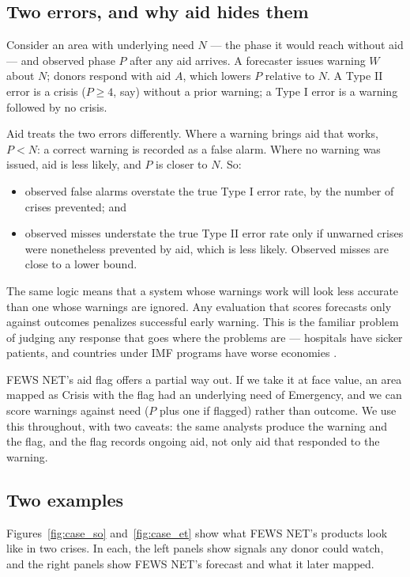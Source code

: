 \documentclass[11pt]{article}
\begin{document}
\subsection{Two errors, and why aid hides them}\label{sec:framework}

Consider an area with underlying need $N$ --- the phase it would reach without aid --- and observed phase $P$ after any aid arrives. A forecaster issues warning $W$ about $N$; donors respond with aid $A$, which lowers $P$ relative to $N$. A Type II error is a crisis ($P \ge 4$, say) without a prior warning; a Type I error is a warning followed by no crisis.

Aid treats the two errors differently. Where a warning brings aid that works, $P < N$: a correct warning is recorded as a false alarm. Where no warning was issued, aid is less likely, and $P$ is closer to $N$. So:
\begin{itemize}
  \item observed false alarms overstate the true Type I error rate, by the number of crises prevented; and
  \item observed misses understate the true Type II error rate only if unwarned crises were nonetheless prevented by aid, which is less likely. Observed misses are close to a lower bound.
\end{itemize}
The same logic means that a system whose warnings work will look less accurate than one whose warnings are ignored. Any evaluation that scores forecasts only against outcomes penalizes successful early warning. This is the familiar problem of judging any response that goes where the problems are --- hospitals have sicker patients, and countries under IMF programs have worse economies \citep{barro2005imf}.

FEWS NET's aid flag offers a partial way out. If we take it at face value, an area mapped as Crisis with the flag had an underlying need of Emergency, and we can score warnings against need ($P$ plus one if flagged) rather than outcome. We use this throughout, with two caveats: the same analysts produce the warning and the flag, and the flag records ongoing aid, not only aid that responded to the warning.

\subsection{Two examples}\label{sec:examples}

Figures~\ref{fig:case_so} and~\ref{fig:case_et} show what FEWS NET's products look like in two crises. In each, the left panels show signals any donor could watch, and the right panels show FEWS NET's forecast and what it later mapped.
\end{document}
